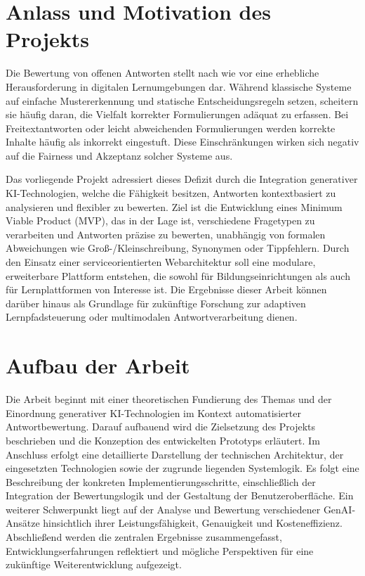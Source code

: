 \documentclass[a4paper,12pt]{article}
\begin{document}
\section{Anlass und Motivation des Projekts}
Die Bewertung von offenen Antworten stellt nach wie vor eine erhebliche Herausforderung in digitalen Lernumgebungen dar. Während klassische Systeme auf einfache Mustererkennung und statische Entscheidungsregeln setzen, scheitern sie häufig daran, die Vielfalt korrekter Formulierungen adäquat zu erfassen. Bei Freitextantworten oder leicht abweichenden Formulierungen werden korrekte Inhalte häufig als inkorrekt eingestuft. Diese Einschränkungen wirken sich negativ auf die Fairness und Akzeptanz solcher Systeme aus.

Das vorliegende Projekt adressiert dieses Defizit durch die Integration generativer KI-Technologien, welche die Fähigkeit besitzen, Antworten kontextbasiert zu analysieren und flexibler zu bewerten. Ziel ist die Entwicklung eines Minimum Viable Product (MVP), das in der Lage ist, verschiedene Fragetypen zu verarbeiten und Antworten präzise zu bewerten, unabhängig von formalen Abweichungen wie Groß-/Kleinschreibung, Synonymen oder Tippfehlern. Durch den Einsatz einer serviceorientierten Webarchitektur soll eine modulare, erweiterbare Plattform entstehen, die sowohl für Bildungseinrichtungen als auch für Lernplattformen von Interesse ist. Die Ergebnisse dieser Arbeit können darüber hinaus als Grundlage für zukünftige Forschung zur adaptiven Lernpfadsteuerung oder multimodalen Antwortverarbeitung dienen.

\newpage

\section{Aufbau der Arbeit}
Die Arbeit beginnt mit einer theoretischen Fundierung des Themas und der Einordnung generativer KI-Technologien im Kontext automatisierter Antwortbewertung. Darauf aufbauend wird die Zielsetzung des Projekts beschrieben und die Konzeption des entwickelten Prototyps erläutert. Im Anschluss erfolgt eine detaillierte Darstellung der technischen Architektur, der eingesetzten Technologien sowie der zugrunde liegenden Systemlogik. Es folgt eine Beschreibung der konkreten Implementierungsschritte, einschließlich der Integration der Bewertungslogik und der Gestaltung der Benutzeroberfläche. Ein weiterer Schwerpunkt liegt auf der Analyse und Bewertung verschiedener GenAI-Ansätze hinsichtlich ihrer Leistungsfähigkeit, Genauigkeit und Kosteneffizienz. Abschließend werden die zentralen Ergebnisse zusammengefasst, Entwicklungserfahrungen reflektiert und mögliche Perspektiven für eine zukünftige Weiterentwicklung aufgezeigt.
\end{document}
